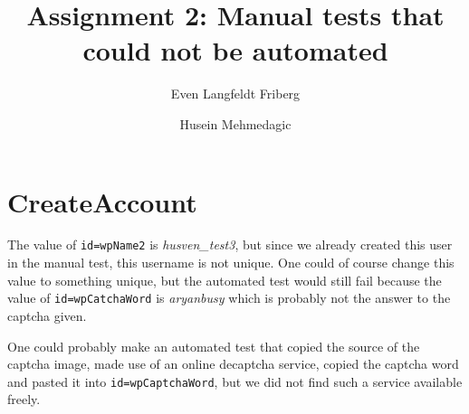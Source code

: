\documentclass[a4paper,10pt]{article}
\title{Assignment 2: Manual tests that could not be automated}
\author{Even Langfeldt Friberg \and Husein Mehmedagic}
\begin{document}
\maketitle

\section{CreateAccount}
The value of \texttt{id=wpName2} is \textit{husven\_test3}, but since we already created this user in the manual test, this username is not unique. One could of course 
change this value to something unique, but the automated test would still fail because the value of \texttt{id=wpCatchaWord} is \textit{aryanbusy} which is probably not 
the answer to the captcha given.

One could probably make an automated test that copied the source of the captcha image, made use of an online decaptcha service, copied the captcha word 
and pasted it into \texttt{id=wpCaptchaWord}, but we did not find such a service available freely.
\end{document}
